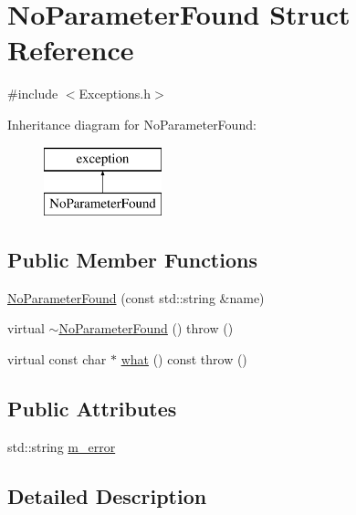 \hypertarget{struct_no_parameter_found}{\section{No\-Parameter\-Found Struct Reference}
\label{struct_no_parameter_found}
}


{\ttfamily \#include $<$Exceptions.\-h$>$}

Inheritance diagram for No\-Parameter\-Found\-:\begin{figure}[H]
\begin{center}
\leavevmode
\includegraphics[height=2.000000cm]{struct_no_parameter_found}
\end{center}
\end{figure}
\subsection*{Public Member Functions}
\begin{DoxyCompactItemize}
\item 
\hyperlink{struct_no_parameter_found_ae0928e96c064f6cab3c88b5eb7263202}{No\-Parameter\-Found} (const std\-::string \&name)
\item 
virtual \hyperlink{struct_no_parameter_found_a9b8117cfa44fbf9ea15f42cfa1041d36}{$\sim$\-No\-Parameter\-Found} ()  throw ()
\item 
virtual const char $\ast$ \hyperlink{struct_no_parameter_found_ae7407095e9073afb09d7749c6b55b2e9}{what} () const   throw ()
\end{DoxyCompactItemize}
\subsection*{Public Attributes}
\begin{DoxyCompactItemize}
\item 
std\-::string \hyperlink{struct_no_parameter_found_a548745eb39b10918acd8199f21d7d455}{m\-\_\-error}
\end{DoxyCompactItemize}


\subsection{Detailed Description}


